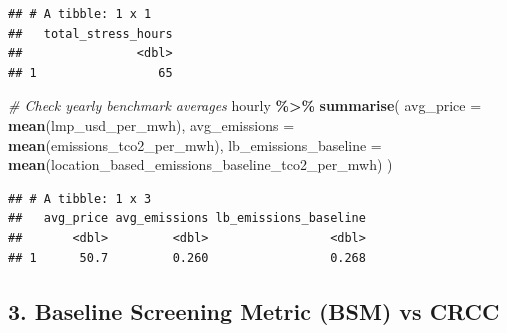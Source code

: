 \documentclass[
]{article}
\newenvironment{Shaded}{\begin{snugshade}}{\end{snugshade}}
\newcommand{\AttributeTok}[1]{\textcolor[rgb]{0.13,0.29,0.53}{#1}}
\newcommand{\CommentTok}[1]{\textcolor[rgb]{0.56,0.35,0.01}{\textit{#1}}}
\newcommand{\FunctionTok}[1]{\textcolor[rgb]{0.13,0.29,0.53}{\textbf{#1}}}
\newcommand{\NormalTok}[1]{#1}
\newcommand{\SpecialCharTok}[1]{\textcolor[rgb]{0.81,0.36,0.00}{\textbf{#1}}}
\begin{document}
\begin{verbatim}
## # A tibble: 1 x 1
##   total_stress_hours
##                <dbl>
## 1                 65
\end{verbatim}

\begin{Shaded}
\begin{Highlighting}[]
\CommentTok{\# Check yearly benchmark averages}
\NormalTok{hourly }\SpecialCharTok{\%\textgreater{}\%}
  \FunctionTok{summarise}\NormalTok{(}
    \AttributeTok{avg\_price =} \FunctionTok{mean}\NormalTok{(lmp\_usd\_per\_mwh),}
    \AttributeTok{avg\_emissions =} \FunctionTok{mean}\NormalTok{(emissions\_tco2\_per\_mwh),}
    \AttributeTok{lb\_emissions\_baseline =} \FunctionTok{mean}\NormalTok{(location\_based\_emissions\_baseline\_tco2\_per\_mwh)}
\NormalTok{  )}
\end{Highlighting}
\end{Shaded}

\begin{verbatim}
## # A tibble: 1 x 3
##   avg_price avg_emissions lb_emissions_baseline
##       <dbl>         <dbl>                 <dbl>
## 1      50.7         0.260                 0.268
\end{verbatim}

\subsection{3. Baseline Screening Metric (BSM) vs
CRCC}\label{baseline-screening-metric-bsm-vs-crcc}
\end{document}
